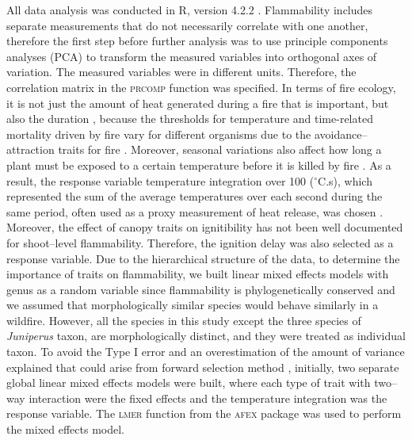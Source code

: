 \documentclass{bmcart}
\newcommand{\pkg}[1]{\textsc{#1}}
\begin{document}
All data analysis was conducted in R, version 4.2.2 \citep{R}. 
Flammability includes separate measurements that do not necessarily correlate with one another, therefore the first step before further analysis was to use principle components analyses (PCA) to transform the measured variables into orthogonal axes of variation. The measured variables were in different units. Therefore, the correlation matrix in the \pkg{prcomp} function was specified. In terms of fire ecology, it is not just the amount of heat generated during a fire that is important, but also the duration \citep{mcgranahan2020inconvenient}, because the thresholds for temperature and time-related mortality driven by fire vary for different organisms \citep{nelson1952observations,vines1968heat, bond1983dead, hengst1994bark,pinard1997fire,lawes2011bark, pingree2019myth} due to the avoidance–attraction traits for fire \citep{schwilk2001flammability, archibald2019unified}. Moreover, seasonal variations also affect how long a plant must be exposed to a certain temperature before it is killed by fire \citep{wright1970method}. As a result, the response variable temperature integration over 100 ($^{\circ}$C.s), which represented the sum of the average temperatures over each second during the same period, often used as a proxy measurement of heat release, was chosen \citep{gao2018grass, mcgranahan2020inconvenient}. Moreover, the effect of canopy traits on ignitibility has not been well documented for shoot--level flammability. Therefore, the ignition delay was also selected as a response variable. Due to the hierarchical structure of the data, to determine the importance of traits on flammability, we built linear mixed effects models with genus as a random variable since flammability is phylogenetically conserved \citep{cui2020shoot} and we assumed that morphologically similar species would behave similarly in a wildfire. However, all the species in this study except the three species of \emph{Juniperus} taxon,
are morphologically distinct, and they were treated as individual taxon. To avoid the  Type I error and an overestimation of the amount of variance explained that could arise from forward selection method \citep{blanchet2008forward}, initially, two separate global linear mixed effects models were built, where each type of trait with two--way interaction were the fixed effects and the temperature integration was the response variable. The \pkg{lmer} function from the \pkg{afex} package \citep{singmann2015packageafex,afexluke2017evaluating} was used to perform the mixed effects model. 
\end{document}

